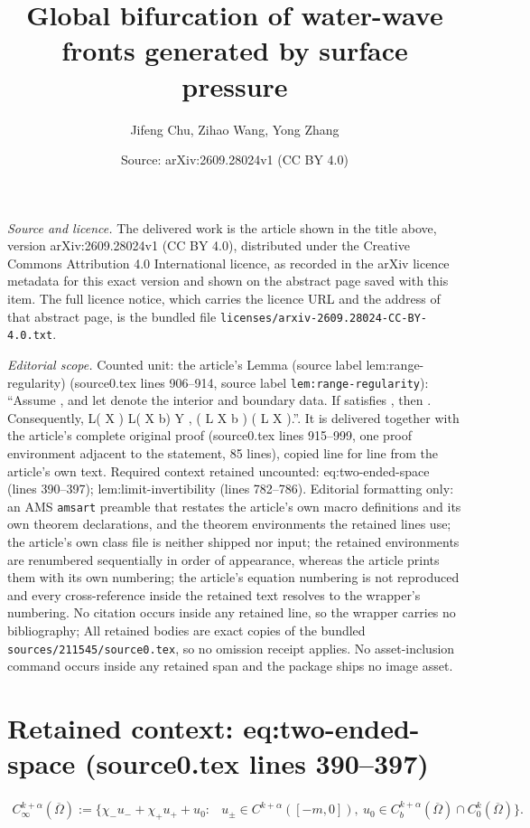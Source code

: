 \documentclass[10pt,a4paper]{amsart}
\title[Global bifurcation of water-wave fronts generated by surface pressure]{Global bifurcation of water-wave fronts generated by surface pressure}
\author{Jifeng Chu, Zihao Wang, Yong Zhang}
\date{Source: arXiv:2609.28024v1 (CC BY 4.0)}
\theoremstyle{plain}
\begin{document}
\maketitle

\noindent\emph{Source and licence.} The delivered work is the article shown in the title above, version arXiv:2609.28024v1 (CC BY 4.0), distributed under the Creative Commons Attribution 4.0 International licence, as recorded in the arXiv licence metadata for this exact version and shown on the abstract page saved with this item. The full licence notice, which carries the licence URL and the address of that abstract page, is the bundled file \texttt{licenses/arxiv-2609.28024-CC-BY-4.0.txt}.
\par\smallskip

\noindent\textit{Editorial scope.} Counted unit: the article's Lemma (source label lem:range-regularity) (source0.tex lines 906--914, source label \texttt{lem:range-regularity}): ``Assume , and let denote the interior and boundary data. If satisfies , then . Consequently, L( X ) L( X b) Y , ( L X b ) ( L X ).''. It is delivered together with the article's complete original proof (source0.tex lines 915--999, one proof environment adjacent to the statement, 85 lines), copied line for line from the article's own text. Required context retained uncounted: eq:two-ended-space (lines 390--397); lem:limit-invertibility (lines 782--786). Editorial formatting only: an AMS \texttt{amsart} preamble that restates the article's own macro definitions and its own theorem declarations, and the theorem environments the retained lines use; the article's own class file is neither shipped nor input; the retained environments are renumbered sequentially in order of appearance, whereas the article prints them with its own numbering; the article's equation numbering is not reproduced and every cross-reference inside the retained text resolves to the wrapper's numbering. No citation occurs inside any retained line, so the wrapper carries no bibliography; All retained bodies are exact copies of the bundled \texttt{sources/211545/source0.tex}, so no omission receipt applies. No asset-inclusion command occurs inside any retained span and the package ships no image asset.


\section*{Retained context: eq:two-ended-space (source0.tex lines 390--397)}

	\begin{equation}\label{eq:two-ended-space}
		\begin{aligned}
			C_\infty^{k+\alpha}(\overline\Omega):=
			\bigl\{\chi_-u_-+\chi_+u_++u_0:{}&
			u_\pm\in C^{k+\alpha}([-m,0]),~u_0\in C_b^{k+\alpha}(\overline\Omega)
			\cap C_0^k(\overline\Omega)\bigr\}.
		\end{aligned}
	\end{equation}
\end{document}
